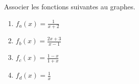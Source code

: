 
\begin{exercice}\label{exosmath-0334}

    Associer les fonctions suivantes au graphes.

\begin{center}
   
\end{center}

\let\Oldtheenumi\theenumi
\renewcommand{\theenumi}{(\alph{enumi})}
\begin{multicols}{2}
    \begin{enumerate}
        \item
            \( f_a(x)=\frac{1}{ x+2 }\)
        \item
            \( f_b(x)=\frac{ 2x+3 }{ x-1 }\)
        \item
            \( f_c(x)=\frac{ 1-x }{ 1+x }\)
        \item
            \( f_d(x)=\frac{ 1 }{ x }\)
    \end{enumerate}
\end{multicols}
\let\theenumi\Oldtheenumi

\end{exercice}

